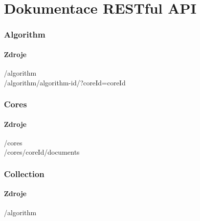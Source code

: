 \documentclass[thesis=M,czech]{FITthesis}[2014/05/07]
\begin{document}
\begin{conclusion}
\end{conclusion}




\appendix

\chapter{Dokumentace RESTful API}
\label{restfulapi}

\subsection{Algorithm}

\subsubsection{Zdroje}

\begin{description}
	\item[/algorithm]
	\item[/algorithm/{algorithm-id}/?coreId={coreId}]
\end{description}

\subsection{Cores}

\subsubsection{Zdroje}

\begin{description}
	\item[/cores]
	\item[/cores/{coreId}/documents]
\end{description}

\subsection{Collection}

\subsubsection{Zdroje}

\begin{description}
	\item[/algorithm]
	\item[]
	\item[]
\end{description}
\end{document}
